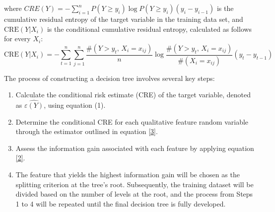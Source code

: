 \documentclass[twoside]{article}
\begin{document}
where $CRE(Y) = -\sum_{i=1}^{n}P(Y\geq y_{i}) \log P(Y\geq y_{i})(y_{i}-y_{i-1})  $ is the cumulative residual entropy of the target variable in the training data set, and \(\text{CRE}(Y|X_i)\) is the conditional cumulative residual entropy, calculated as follows for every \(X_i\):
\begin{equation}\label{3}
\mathrm{CRE}(Y|X_i) = -\sum_{t=1}^{n}\sum_{j=1}^{n} \dfrac{\#(Y>y_t,\, X_i = x_{ij})}{n} \log \dfrac{\#(Y>y_t,\, X_i = x_{ij})}{\#(X_i = x_{ij})} (y_t - y_{t-1})
\end{equation}

The process of constructing a decision tree involves several key steps:

\begin{enumerate}
    \item Calculate the conditional risk estimate (CRE) of the target variable, denoted as \(\widehat{\varepsilon(Y)}\), using equation (1).
    \item Determine the conditional CRE for each qualitative feature random variable through the estimator outlined in equation \eqref{3}.
    \item Assess the information gain associated with each feature by applying equation \eqref{2}.
    \item The feature that yields the highest information gain will be chosen as the splitting criterion at the tree's root. Subsequently, the training dataset will be divided based on the number of levels at the root, and the process from Steps 1 to 4 will be repeated until the final decision tree is fully developed.
\end{enumerate}
\end{document}
